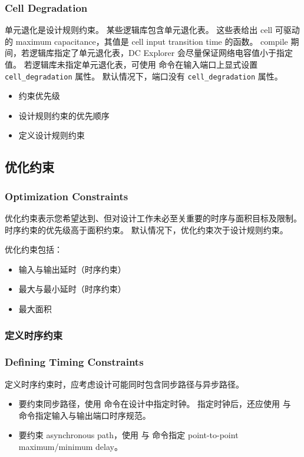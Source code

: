 \subsubsection*{Cell Degradation}

单元退化是设计规则约束。
某些逻辑库包含单元退化表。
这些表给出 cell 可驱动的 maximum capacitance，其值是 cell input transition time 的函数。
compile 期间，若逻辑库指定了单元退化表，DC Explorer 会尽量保证网络电容值小于指定值。
若逻辑库未指定单元退化表，可使用  命令在输入端口上显式设置 \texttt{cell\_degradation} 属性。
默认情况下，端口没有 \texttt{cell\_degradation} 属性。

\begin{seeAlsoBox}
\begin{itemize}
  \item 约束优先级
  \item 设计规则约束的优先顺序
  \item 定义设计规则约束
\end{itemize}
\end{seeAlsoBox}

\subsection{优化约束}
\subsubsection*{Optimization Constraints}

优化约束表示您希望达到、但对设计工作未必至关重要的时序与面积目标及限制。
时序约束的优先级高于面积约束。
默认情况下，优化约束次于设计规则约束。

优化约束包括：
\begin{itemize}
  \item 输入与输出延时（时序约束）
  \item 最大与最小延时（时序约束）
  \item 最大面积
\end{itemize}

\subsubsection{定义时序约束}
\subsubsection*{Defining Timing Constraints}

定义时序约束时，应考虑设计可能同时包含同步路径与异步路径。
\begin{itemize}
  \item 要约束同步路径，使用  命令在设计中指定时钟。
        指定时钟后，还应使用  与  命令指定输入与输出端口时序规范。
  \item 要约束 asynchronous path，使用  与  命令指定 point-to-point maximum/minimum delay。
\end{itemize}

